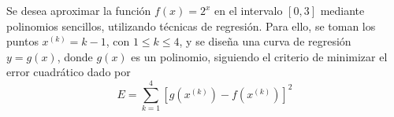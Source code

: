 \ifspanish

\question Se desea aproximar la función $f(x)=2^x$ en el intervalo $[0,3]$ mediante polinomios sencillos, utilizando técnicas de regresión. Para ello, se toman los puntos $x^{(k)}=k-1$, con $1\le k \le 4$, y se diseña una curva de regresión $y=g(x)$, donde $g(x)$ es un polinomio, siguiendo el criterio de minimizar el error cuadrático dado por
$$
E = \sum_{k=1}^4 \left[g\left(x^{(k)}\right)-f\left(x^{(k)}\right)\right]^2
$$

\begin{solution}
\end{solution}

\else

